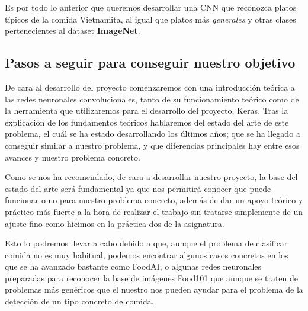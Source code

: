 \vspace{3 mm}

Es por todo lo anterior que queremos desarrollar una CNN que reconozca platos típicos de la comida Vietnamita, al igual que platos más \textit{generales} y otras clases pertenecientes al dataset \textbf{ImageNet}.

\newpage

\subsection{Pasos a seguir para conseguir nuestro objetivo}

De cara al desarrollo del proyecto comenzaremos con una introducción teórica a las redes neuronales convolucionales, tanto de su funcionamiento teórico como de la herramienta que utilizaremos para el desarrollo del proyecto, Keras\cite{keras}. Tras la explicación de los fundamentos teóricos hablaremos del estado del arte de este problema, el cuál se ha estado desarrollando los últimos años; que se ha llegado a conseguir similar a nuestro problema, y que diferencias principales hay entre esos avances y nuestro problema concreto.

Como se nos ha recomendado, de cara a desarrollar nuestro proyecto, la base del estado del arte será fundamental ya que nos permitirá conocer que puede funcionar o no para nuestro problema concreto, además de dar un apoyo teórico y práctico más fuerte a la hora de realizar el trabajo sin tratarse simplemente de un ajuste fino como hicimos en la práctica dos de la asignatura.

Esto lo podremos llevar a cabo debido a que, aunque el problema de clasificar comida no es muy habitual, podemos encontrar algunos casos concretos en los que se ha avanzado bastante como FoodAI, o algunas redes neuronales preparadas para reconocer la base de imágenes Food101 que aunque se traten de problemas más genéricos que el nuestro nos pueden ayudar para el problema de la detección de un tipo concreto de comida.
